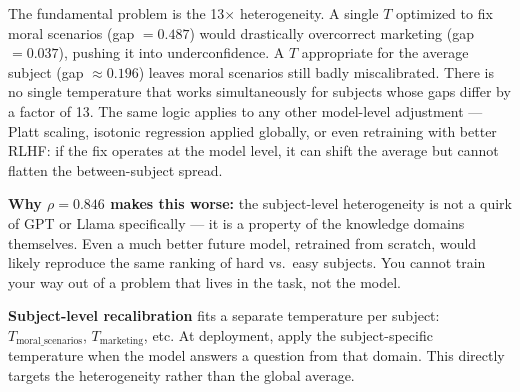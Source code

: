 \documentclass[aspectratio=169,11pt]{beamer}
\begin{document}
{  The fundamental problem is the 13$\times$ heterogeneity. A single $T$ optimized
  to fix moral scenarios (gap $= 0.487$) would drastically overcorrect marketing
  (gap $= 0.037$), pushing it into underconfidence. A $T$ appropriate for the
  average subject (gap $\approx 0.196$) leaves moral scenarios still badly
  miscalibrated. There is no single temperature that works simultaneously for
  subjects whose gaps differ by a factor of 13. The same logic applies to any
  other model-level adjustment --- Platt scaling, isotonic regression applied
  globally, or even retraining with better RLHF: if the fix operates at the
  model level, it can shift the average but cannot flatten the between-subject
  spread.

  \textbf{Why $\rho = 0.846$ makes this worse:} the subject-level heterogeneity
  is not a quirk of GPT or Llama specifically --- it is a property of the knowledge
  domains themselves. Even a much better future model, retrained from scratch,
  would likely reproduce the same ranking of hard vs.\ easy subjects. You cannot
  train your way out of a problem that lives in the task, not the model.

  \textbf{Subject-level recalibration} fits a separate temperature per subject:
  $T_{\text{moral\_scenarios}}$, $T_{\text{marketing}}$, etc. At deployment, apply
  the subject-specific temperature when the model answers a question from that
  domain. This directly targets the heterogeneity rather than the global average.
}
\end{document}
